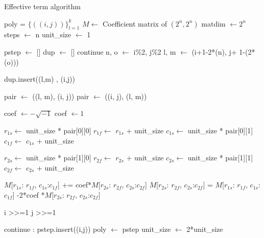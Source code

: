 \documentclass[twocolumn]{article}
\begin{document}
\begin{algorithm}
    \caption{Effective term algorithm}\label{alg:effective_terms}
    \begin{algorithmic}
        \Require poly = $\{((i, j))\}_{l=1}^k$ 
        \Require $M \gets$ Coefficient matrix of $(2^n, 2^n)$
        \State matdim $\gets 2^n$
        \State steps $\gets$ n
        \State unit\_size $\gets$ 1
        
            \State pstep $\gets$ [] 
            \State dup   $\gets$ []
                    continue
                \EndIf
                \State n, o $\gets$ i\%2, j\%2  
                \State l, m $\gets$ (i+1-2*(n), j+ 1-(2*(o))) 
                
                \State dup.insert((l,m) , (i,j))
                
                    \State pair $\gets$ ((l, m), (i, j))
                \Else
                    \State pair $\gets$ ((i, j), (l, m))
                \EndIf

                    \State coef $\gets - \sqrt{-1}$ 
                \Else
                    \State coef $\gets 1$
                \EndIf

                \State $r_{1s}\gets$ unit\_size * pair[0][0]
                \State $r_{1f}\gets$ $r_{1s}$ + unit\_size
                \State $c_{1s}\gets$ unit\_size * pair[0][1]
                \State $c_{1f}\gets$ $c_{1s}$ + unit\_size

                \State $r_{2s}\gets$ unit\_size * pair[1][0]
                \State $r_{2f}\gets$ $r_{2s}$ + unit\_size
                \State $c_{2s}\gets$ unit\_size * pair[1][1]
                \State $c_{2f}\gets$ $c_{2s}$ + unit\_size

                \State $M$[$r_{1s}$: $r_{1f}$, $c_{1s}$:$c_{1f}$] += coef*$M$[$r_{2s}$: $r_{2f}$, $c_{2s}$:$c_{2f}$]
                \State $M$[$r_{2s}$: $r_{2f}$, $c_{2s}$:$c_{2f}$] = $M$[$r_{1s}$: $r_{1f}$, $c_{1s}$:$c_{1f}$] -2*coef *$M$[$r_{2s}$: $r_{2f}$, $c_{2s}$:$c_{2f}$]

                \State i >>=1 
                \State j >>=1

                    continue
                \Else:
                    pstep.insert((i,j))
                \EndIf
            \EndFor
            \State poly $\gets$ pstep
            \State unit\_size $\gets$ 2*unit\_size
        \EndFor
    \end{algorithmic}
\end{algorithm}
\end{document}
